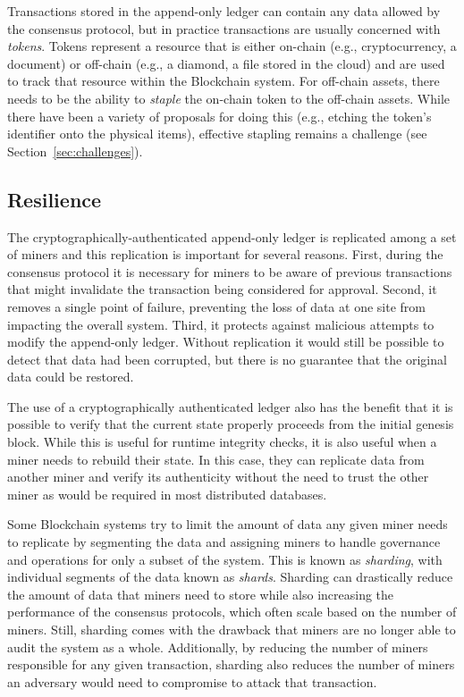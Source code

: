 Transactions stored in the append-only ledger can contain any data allowed by the consensus protocol, but in practice transactions are usually concerned with \emph{tokens}.
Tokens represent a resource that is either on-chain (e.g., cryptocurrency, a document) or off-chain (e.g., a diamond, a file stored in the cloud) and are used to track that resource within the Blockchain system.
For off-chain assets, there needs to be the ability to \emph{staple} the on-chain token to the off-chain assets.
While there have been a variety of proposals for doing this (e.g., etching the token's identifier onto the physical items), effective stapling remains a challenge (see Section~\ref{sec:challenges}).

\subsection{Resilience}
The cryptographically-authenticated append-only ledger is replicated among a set of miners and this replication is important for several reasons.
First, during the consensus protocol it is necessary for miners to be aware of previous transactions that might invalidate the transaction being considered for approval.
Second, it removes a single point of failure, preventing the loss of data at one site from impacting the overall system.
Third, it protects against malicious attempts to modify the append-only ledger.
Without replication it would still be possible to detect that data had been corrupted, but there is no guarantee that the original data could be restored.

The use of a cryptographically authenticated ledger also has the benefit that it is possible to verify that the current state properly proceeds from the initial genesis block.
While this is useful for runtime integrity checks, it is also useful when a miner needs to rebuild their state.
In this case, they can replicate data from another miner and verify its authenticity without the need to trust the other miner as would be required in most distributed databases.

Some Blockchain systems try to limit the amount of data any given miner needs to replicate by segmenting the data and assigning miners to handle governance and operations for only a subset of the system.
This is known as \emph{sharding}, with individual segments of the data known as \emph{shards}.
Sharding can drastically reduce the amount of data that miners need to store while also increasing the performance of the consensus protocols, which often scale based on the number of miners.
Still, sharding comes with the drawback that miners are no longer able to audit the system as a whole.
Additionally, by reducing the number of miners responsible for any given transaction, sharding also reduces the number of miners an adversary would need to compromise to attack that transaction.

